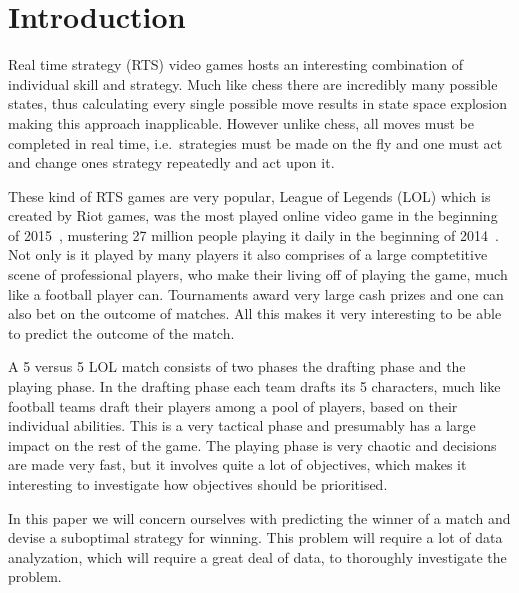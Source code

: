 \section{Introduction}\label{sec:intro}

Real time strategy (RTS) video games hosts an interesting combination of individual skill and strategy. Much like chess there are incredibly many possible states, thus calculating every single possible move results in state space explosion making this approach inapplicable. However unlike chess, all moves must be completed in real time, i.e.\ strategies must be made on the fly and one must act and change ones strategy repeatedly and act upon it. 

These kind of RTS games are very popular, League of Legends (LOL) which is created by Riot games, was the most played online video game in the beginning of 2015~\cite{LoLmostplayed}, mustering 27 million people playing it daily in the beginning of 2014~\cite{LoL27mill}. Not only is it played by many players it also comprises of a large comptetitive scene of professional players, who make their living off of playing the game, much like a football player can. Tournaments award very large cash prizes and one can also bet on the outcome of matches. 
All this makes it very interesting to be able to predict the outcome of the match.

A 5 versus 5 LOL match consists of two phases the drafting phase and the playing phase. In the drafting phase each team drafts its 5 characters, much like football teams draft their players among a pool of players, based on their individual abilities. This is a very tactical phase and presumably has a large impact on the rest of the game. The playing phase is very chaotic and decisions are made very fast, but it involves quite a lot of objectives, which makes it interesting to investigate how objectives should be prioritised.

In this paper we will concern ourselves with predicting the winner of a match and devise a suboptimal strategy for winning. This problem will require a lot of data analyzation, which will require a great deal of data, to thoroughly investigate the problem.



